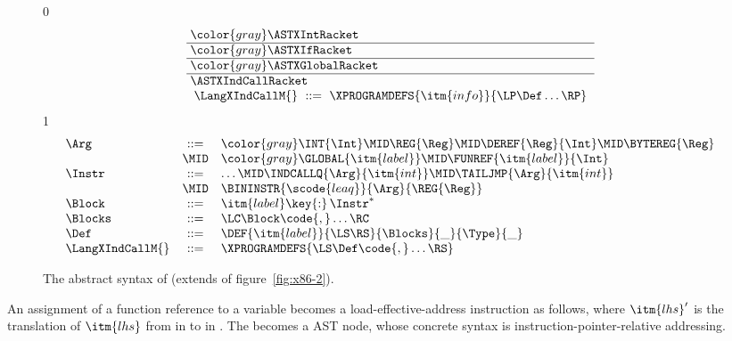 \documentclass[7x10]{TimesAPriori_MIT}%
\newcommand{\gray}[1]{{\color{gray} #1}}
\def\racketEd{0}
\def\pythonEd{1}
\def\edition{1}
\newcommand{\pythonColor}[0]{}
\numberwithin{theorem}{chapter}
\numberwithin{definition}{chapter}
\numberwithin{equation}{chapter}
\begin{document}
\begin{figure}[tp]
  \begin{tcolorbox}[colback=white]
    \small
{\if\edition\racketEd
\[\arraycolsep=3pt
\begin{array}{l}
  \gray{\ASTXIntRacket} \\ \hline
  \gray{\ASTXIfRacket} \\ \hline
  \gray{\ASTXGlobalRacket} \\ \hline
  \ASTXIndCallRacket \\
\begin{array}{lcl}
\LangXIndCallM{} &::= & \XPROGRAMDEFS{\itm{info}}{\LP\Def\ldots\RP}
\end{array}
\end{array}
\]
\fi}
{\if\edition\pythonEd\pythonColor
\[
\begin{array}{lcl}
  \Arg &::=&  \gray{  \INT{\Int} \MID \REG{\Reg} \MID \DEREF{\Reg}{\Int}
     \MID \BYTEREG{\Reg} } \\
     &\MID& \gray{ \GLOBAL{\itm{label}} } \MID \FUNREF{\itm{label}}{\Int} \\
  \Instr &::=& \ldots \MID \INDCALLQ{\Arg}{\itm{int}}
    \MID \TAILJMP{\Arg}{\itm{int}}\\
    &\MID& \BININSTR{\scode{leaq}}{\Arg}{\REG{\Reg}}\\
  \Block &::=&\itm{label}\key{:}\,\Instr^{*} \\
  \Blocks &::= & \LC\Block\code{,}\ldots\RC\\
  \Def &::= & \DEF{\itm{label}}{\LS\RS}{\Blocks}{\_}{\Type}{\_} \\
\LangXIndCallM{} &::= & \XPROGRAMDEFS{\LS\Def\code{,}\ldots\RS}
\end{array}
\]
\fi}
  \end{tcolorbox}
\caption{The abstract syntax of \LangXIndCall{} (extends
  \LangXGlobal{} of figure~\ref{fig:x86-2}).}
\label{fig:x86-3}
\end{figure}

An assignment of a function reference to a variable becomes a
load-effective-address instruction as follows, where $\itm{lhs}'$ is
the translation of $\itm{lhs}$ from \Atm{} in \LangCFun{} to \Arg{} in
\LangXIndCallVar{}. The  becomes a  AST
node, whose concrete syntax is instruction-pointer-relative
addressing.
\end{document}
